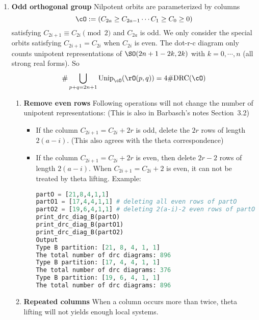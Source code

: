 \documentclass[12pt,a4paper]{amsart}
\numberwithin{equation}{section}
\theoremstyle{remark}
\def\drc{\mathrm{DRC}}
\def\Unip{\mathrm{Unip}}
\begin{document}
\begin{enumerate}
\item {\bfseries Odd orthogonal group} Nilpotent orbits are parameterized by
  columns
  \[
    \cO := (C_{2a}\geq C_{2a-1}\cdots C_1\geq C_0 \geq 0 )
  \]
  satisfying $C_{2i+1}\equiv C_{2i} \pmod{2}$ and $C_{2a}$ is odd.  We only
  consider the special orbits satisfying $C_{2i+1}=C_{2i}$ when $C_{2i}$ is
  even.  The dot-r-c diagram only counts unipotent representations of
  $\SO(2n+1 -2k,2k)$ with $k = 0, \cdots, n$ (all strong real forms). So
  \[
    \# \bigcup_{p+q=2n+1}\Unip_\cO(\rO(p,q)) = 4 \# \drc(\cO)
  \]
  \begin{enumerate}
  \item {\bfseries Remove even rows} Following operations will not change the
    number of unipotent representations: (This is also in Barbasch's notes
    Section~3.2)
    \begin{itemize}
    \item If the column $C_{2i+1} = C_{2i}+2r$ is odd, delete the $2r$ rows of
      length $2(a-i)$.  (This also agrees with the theta correspondence)
    \item If the column $C_{2i+1} = C_{2i}+2r$ is even, then delete {\color{red}
        $2r-2$} rows of length $2(a-i)$.  {\color{blue} When $C_{2i+1} =
        C_{2i}+2$ is even, it can not be
        treated by theta lifting. Example:}
\begin{lstlisting}[language=Python]
partO = [21,8,4,1,1]
partO1 = [17,4,4,1,1] # deleting all even rows of partO
partO2 = [19,6,4,1,1] # deleting 2(a-i)-2 even rows of partO
print_drc_diag_B(partO)
print_drc_diag_B(partO1)
print_drc_diag_B(partO2)
Output
Type B partition: [21, 8, 4, 1, 1]
The total number of drc diagrams: 896
Type B partition: [17, 4, 4, 1, 1]
The total number of drc diagrams: 376
Type B partition: [19, 6, 4, 1, 1]
The total number of drc diagrams: 896
\end{lstlisting}
    \end{itemize}
  \item {\bfseries Repeated columns} When a column occurs more than twice, theta
    lifting will not yields enough local systems.


\end{enumerate}
\end{enumerate}
\end{document}
